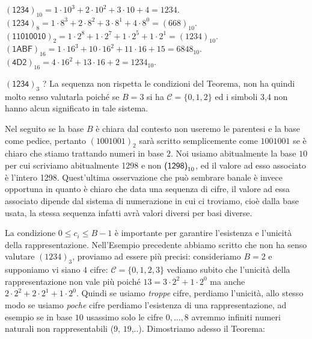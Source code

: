 \begin{ex} 
$(\textsf{1234})_{10} = 1\cdot 10^3+2\cdot 10^2 + 3 \cdot 10 + 4 =
1234$. $(\textsf{1234})_8 = 1\cdot 8^3+2\cdot 8^2+3\cdot 8^1+4\cdot 8^0 =
(668)_{10}$. $(\textsf{11010010})_2 = 1\cdot 2^8 + 1\cdot 2^7 + 1\cdot 2^5 +
1\cdot 2^1 = (1234)_{10}$. $(\textsf{1ABF})_{16} = 1\cdot 16^3 + 10\cdot 16^2 +
11 \cdot 16 + 15 = 6848_{10}$. $(\textsf{4D2})_{16} = 4\cdot 16^2 + 13\cdot 16
+ 2 = 1234_{10}$. 

\noindent $(\textsf{1234})_3$ ? La sequenza non rispetta le condizioni
del Teorema, non ha quindi molto senso valutarla poiché se $B = 3$ si ha
$\mathcal{C} = \{ 0, 1, 2 \}$ ed i simboli \textsf{3,4} non hanno alcun
significato in tale sistema. \end{ex}

Nel seguito se la base $B$ è chiara dal contesto non useremo le parentesi e la
base come pedice, pertanto $ (1001001)_2$ sarà scritto semplicemente come
$1001001$ se è chiaro che stiamo trattando numeri in base $2$. Noi usiamo
abitualmente la base $10$ per cui scriviamo abitualmente \textsf{1298} e non
$\mbox{\textsf{(1298)}}_{10}$, ed il valore ad esso associato è l'intero 1298.
Quest'ultima osservazione che può sembrare banale è invece opportuna in quanto
è chiaro che data una sequenza di cifre, il valore ad essa associato dipende
dal sistema di numerazione in cui ci troviamo, cioè dalla base usata, la stessa
sequenza infatti avrà valori diversi per basi diverse. 

La condizione $0 \leq c_i \leq
B-1$ è
importante per garantire l'esistenza e l'unicità della rappresentazione.
Nell'Esempio precedente abbiamo scritto che non ha senso valutare $(1234)_3$,
proviamo ad essere più precisi: consideriamo $B = 2$ e supponiamo vi siano $4$
cifre: $\mathcal{C} = \{ 0, 1, 2, 3 \}$ vediamo subito che l'unicità della
rappresentazione non vale più poiché $13 = 3\cdot 2^2 + 1 \cdot 2^0$ ma anche
$2\cdot 2^2 + 2\cdot 2^1 + 1\cdot 2^0$. Quindi se usiamo \emph{troppe} cifre,
perdiamo l'unicità, allo stesso modo se usiamo \emph{poche} cifre perdiamo
l'esistenza di una rappresentazione, ad esempio se in base $10$ usassimo solo
le cifre $0,\ldots,8$ avremmo infiniti numeri naturali non rappresentabili ($9$, $19$,..).
Dimostriamo adesso il Teorema:

